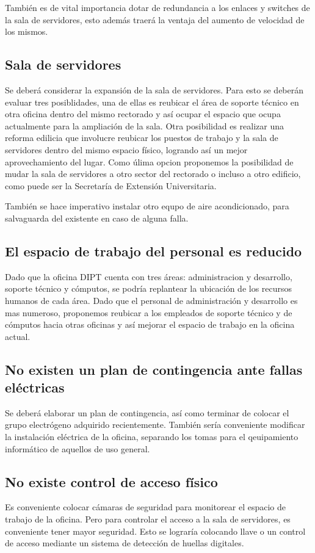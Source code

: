 \documentclass[a4paper,11pt,oneside]{article}
\begin{document}
También es de vital importancia dotar de redundancia a los enlaces y
switches de la sala de servidores, esto además traerá la ventaja del
aumento de velocidad de los mismos.
%
\subsection*{Sala de servidores}
Se deberá considerar la expansión de la sala de servidores. Para esto
se deberán evaluar tres posiblidades, una de ellas es reubicar el área
de soporte técnico en otra oficina dentro del mismo rectorado y así
ocupar el espacio que ocupa actualmente para la ampliación de la sala.
Otra posibilidad es realizar una reforma edilicia que involucre
reubicar los puestos de trabajo y la sala de servidores dentro del
mismo espacio físico, logrando así un mejor aprovechamiento del lugar.
Como úlima opcion proponemos la posibilidad de mudar la sala de
servidores a otro sector del rectorado o incluso a otro edificio, como
puede ser la Secretaría de Extensión Universitaria.

También se hace imperativo instalar otro equpo de aire acondicionado,
para salvaguarda del existente en caso de alguna falla.
%
\subsection*{El espacio de trabajo del personal es reducido}
Dado que la oficina DIPT cuenta con tres áreas: administracion y
desarrollo, soporte técnico y cómputos, se podría replantear la
ubicación de los recursos humanos de cada área. Dado que el personal
de administración y desarrollo es mas numeroso, proponemos reubicar a
los empleados de soporte técnico y de cómputos hacia otras oficinas y
así mejorar el espacio de trabajo en la oficina actual.
%
\subsection*{No existen un plan de contingencia ante fallas eléctricas}
Se deberá elaborar un plan de contingencia, así como terminar de
colocar el grupo electrógeno adquirido recientemente.  También sería
conveniente modificar la instalación eléctrica de la oficina,
separando los tomas para el qeuipamiento informático de aquellos de
uso general.
%
\subsection*{No existe control de acceso físico}
Es conveniente colocar cámaras de seguridad para monitorear el espacio
de trabajo de la oficina. Pero para controlar el acceso a la sala de
servidores, es conveniente tener mayor seguridad. Esto se lograría
colocando llave o un control de acceso mediante un sistema de
detección de huellas digitales.
%
\end{document}
